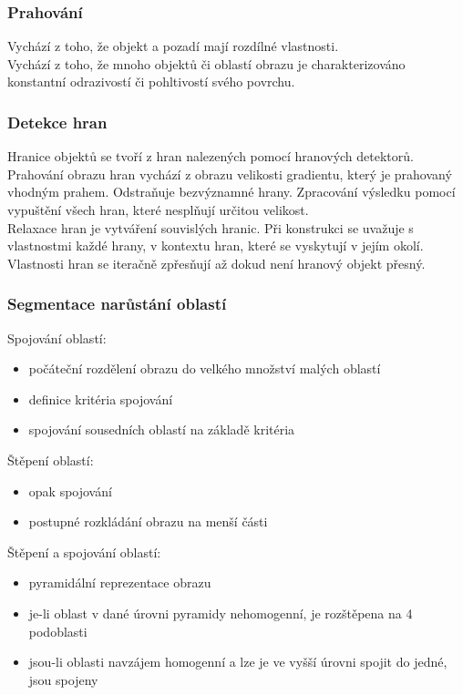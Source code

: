 \subsubsection{Prahování}
Vychází z toho, že objekt a pozadí mají rozdílné vlastnosti.\\
Vychází z toho, že mnoho objektů či oblastí obrazu je charakterizováno konstantní odrazivostí či pohltivostí svého povrchu.\\

\subsubsection{Detekce hran}
Hranice objektů se tvoří z hran nalezených pomocí hranových detektorů.\\
Prahování obrazu hran vychází z obrazu velikosti gradientu, který je prahovaný vhodným prahem. Odstraňuje bezvýznamné hrany. Zpracování výsledku pomocí vypuštění všech hran, které nesplňují určitou velikost.\\
Relaxace hran je vytváření souvislých hranic. Při konstrukci se uvažuje s vlastnostmi každé hrany, v kontextu hran, které se vyskytují v jejím okolí. Vlastnosti hran se iteračně zpřesňují až dokud není hranový objekt přesný.\\

\subsubsection{Segmentace narůstání oblastí}
Spojování oblastí:
\begin{itemize}
    \item počáteční rozdělení obrazu do velkého množství malých oblastí
    \item definice kritéria spojování
    \item spojování sousedních oblastí na základě kritéria
\end{itemize}
Štěpení oblastí:
\begin{itemize}
    \item opak spojování
    \item postupné rozkládání obrazu na menší části
\end{itemize}
Štěpení a spojování oblastí:
\begin{itemize}
    \item pyramidální reprezentace obrazu
    \item je-li oblast v dané úrovni pyramidy nehomogenní, je rozštěpena na 4 podoblasti
    \item jsou-li oblasti navzájem homogenní a lze je ve vyšší úrovni spojit do jedné, jsou spojeny
\end{itemize}


